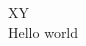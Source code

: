 \documentclass[12pt]{article}
\newlength{\wid}
\begin{document}
\settowidth{\wid}{Hello world}X\hspace{\wid}Y\\
Hello world
\end{document}
